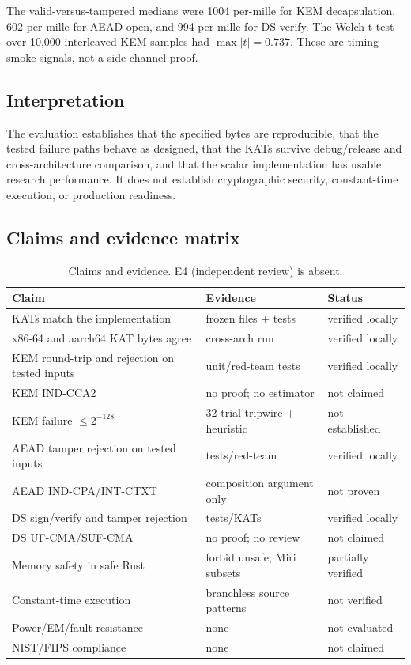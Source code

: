 \documentclass[runningheads]{llncs}
\begin{document}
The valid-versus-tampered medians were 1004 per-mille for KEM
decapsulation, 602 per-mille for AEAD open, and 994 per-mille for DS
verify.  The Welch t-test over 10,000 interleaved KEM samples had
$\max |t|=0.737$.  These are timing-smoke signals, not a side-channel
proof.

\subsection{Interpretation}

The evaluation establishes that the specified bytes are reproducible,
that the tested failure paths behave as designed, that the KATs survive
debug/release and cross-architecture comparison, and that the scalar
implementation has usable research performance.  It does not establish
cryptographic security, constant-time execution, or production
readiness.


\subsection{Claims and evidence matrix}

\begin{table}[t]
\centering
\small
\begin{tabular}{@{}p{4.7cm}p{4.5cm}p{2.4cm}@{}}
\toprule
Claim & Evidence & Status \\
\midrule
KATs match the implementation & frozen files + tests & verified locally \\
x86-64 and aarch64 KAT bytes agree & cross-arch run & verified locally \\
KEM round-trip and rejection on tested inputs & unit/red-team tests & verified locally \\
KEM IND-CCA2 & no proof; no estimator & not claimed \\
KEM failure $\le 2^{-128}$ & 32-trial tripwire + heuristic & not established \\
AEAD tamper rejection on tested inputs & tests/red-team & verified locally \\
AEAD IND-CPA/INT-CTXT & composition argument only & not proven \\
DS sign/verify and tamper rejection & tests/KATs & verified locally \\
DS UF-CMA/SUF-CMA & no proof; no review & not claimed \\
Memory safety in safe Rust & forbid unsafe; Miri subsets & partially verified \\
Constant-time execution & branchless source patterns & not verified \\
Power/EM/fault resistance & none & not evaluated \\
NIST/FIPS compliance & none & not claimed \\
\bottomrule
\end{tabular}
\caption{Claims and evidence.  E4 (independent review) is absent.}
\label{tab:claims}
\end{table}
\end{document}
